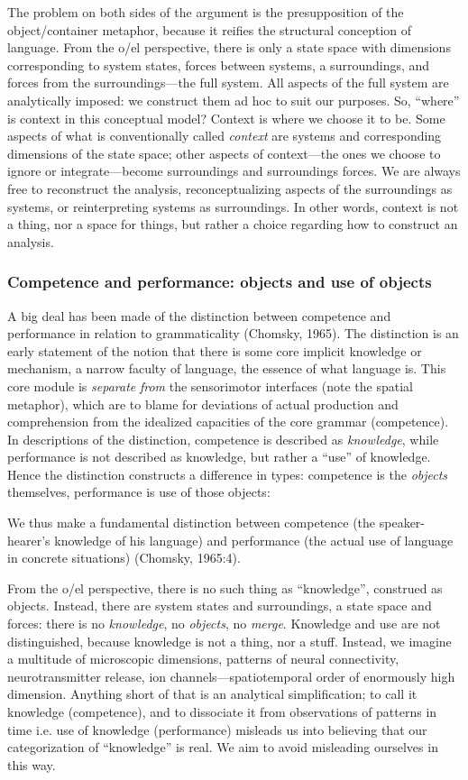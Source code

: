   The problem on both sides of the argument is the presupposition of the object/container metaphor, because it reifies the structural conception of language. From the o/el perspective, there is only a state space with dimensions corresponding to system states, forces between systems, a surroundings, and forces from the surroundings—the full system. All aspects of the full system are analytically imposed: we construct them ad hoc to suit our purposes. So, “where” is context in this conceptual model? Context is where we choose it to be. Some aspects of what is conventionally called \textit{context} are systems and corresponding dimensions of the state space; other aspects of context—the ones we choose to ignore or integrate—become surroundings and surroundings forces. We are always free to reconstruct the analysis, reconceptualizing aspects of the surroundings as systems, or reinterpreting systems as surroundings. In other words, context is not a thing, nor a space for things, but rather a choice regarding how to construct an analysis.

\subsubsection{Competence and performance: objects and use of objects}

A big deal has been made of the distinction between competence and performance in relation to grammaticality (Chomsky, 1965). The distinction is an early statement of the notion that there is some core implicit knowledge or mechanism, a narrow faculty of language, the essence of what language is. This core module is \textit{separate} \textit{from} the sensorimotor interfaces (note the spatial metaphor), which are to blame for deviations of actual production and comprehension from the idealized capacities of the core grammar (competence). In descriptions of the distinction, competence is described as \textit{knowledge}, while performance is not described as knowledge, but rather a “use” of knowledge. Hence the distinction constructs a difference in types: competence is the \textit{objects} themselves, performance is use of those objects:

We thus make a fundamental distinction between competence (the speaker-hearer's knowledge of his language) and performance (the actual use of language in concrete situations) (Chomsky, 1965:4).

  From the o/el perspective, there is no such thing as “knowledge”, construed as objects. Instead, there are system states and surroundings, a state space and forces: there is no \textit{knowledge}, no \textit{objects}, no \textit{merge}. Knowledge and use are not distinguished, because knowledge is not a thing, nor a stuff. Instead, we imagine a multitude of microscopic dimensions, patterns of neural connectivity, neurotransmitter release, ion channels—spatiotemporal order of enormously high dimension. Anything short of that is an analytical simplification; to call it knowledge (competence), and to dissociate it from observations of patterns in time i.e. use of knowledge (performance) misleads us into believing that our categorization of “knowledge” is real. We aim to avoid misleading ourselves in this way.

